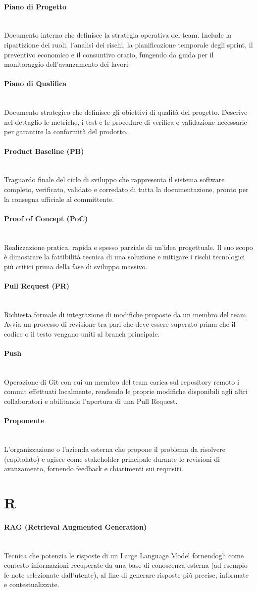 \documentclass[a4paper, 10pt, colorlinks=true, linkcolor=black, urlcolor=blue, citecolor=blue, hidelinks]{article}
\newcommand{\glossaryterm}[2]{
    \paragraph{#1 \label{term:#1}} \mbox{} \\
    #2
    \vspace{0.5em}
}
\begin{document}
\glossaryterm{Piano di Progetto}{Documento interno che definisce la strategia operativa del team. Include la ripartizione dei ruoli, l'analisi dei rischi, la pianificazione temporale degli sprint, il preventivo economico e il consuntivo orario, fungendo da guida per il monitoraggio dell'avanzamento dei lavori.}

\glossaryterm{Piano di Qualifica}{Documento strategico che definisce gli obiettivi di qualità del progetto. Descrive nel dettaglio le metriche, i test e le procedure di verifica e validazione necessarie per garantire la conformità del prodotto.}

\glossaryterm{Product Baseline (PB)}{Traguardo finale del ciclo di sviluppo che rappresenta il sistema software completo, verificato, validato e corredato di tutta la documentazione, pronto per la consegna ufficiale al committente.}

\glossaryterm{Proof of Concept (PoC)}{Realizzazione pratica, rapida e spesso parziale di un'idea progettuale. Il suo scopo è dimostrare la fattibilità tecnica di una soluzione e mitigare i rischi tecnologici più critici prima della fase di sviluppo massivo.}

\glossaryterm{Pull Request (PR)}{Richiesta formale di integrazione di modifiche proposte da un membro del team. Avvia un processo di revisione tra pari che deve essere superato prima che il codice o il testo vengano uniti al branch principale.}

\glossaryterm{Push}{Operazione di Git con cui un membro del team carica sul repository remoto i commit effettuati localmente, rendendo le proprie modifiche disponibili agli altri collaboratori e abilitando l'apertura di una Pull Request.}

\glossaryterm{Proponente}{L'organizzazione o l'azienda esterna che propone il problema da risolvere (capitolato) e agisce come stakeholder principale durante le revisioni di avanzamento, fornendo feedback e chiarimenti sui requisiti.}

\newpage

\section*{R}

\glossaryterm{RAG (Retrieval Augmented Generation)}{Tecnica che potenzia le risposte di un Large Language Model fornendogli come contesto informazioni recuperate da una base di conoscenza esterna (ad esempio le note selezionate dall'utente), al fine di generare risposte più precise, informate e contestualizzate.}
\end{document}
